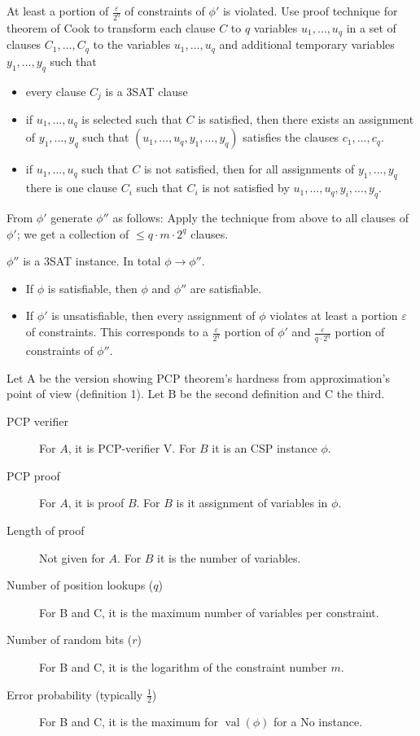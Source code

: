 \documentclass[a4paper]{article}
\begin{document}
At least a portion of $\frac{\varepsilon}{2^q}$ of constraints of $\phi'$
is violated. Use proof technique for theorem of Cook to transform each
clause $C$ to $q$ variables $u_1,\ldots,u_q$ in a set of clauses
$C_1,\ldots,C_q$ to the variables $u_1,\ldots,u_q$ and additional
temporary variables $y_1,\ldots,y_q$ such that
\begin{itemize}
  \item every clause $C_j$ is a 3SAT clause
  \item if $u_1,\ldots,u_q$ is selected such that $C$ is satisfied,
        then there exists an assignment of $y_1,\ldots,y_q$ such that
        $(u_1, \ldots, u_q, y_1, \ldots, y_q)$ satisfies the clauses
        $c_1,\ldots,c_q$.
  \item if $u_1,\ldots,u_q$ such that $C$ is not satisfied,
        then for all assignments of $y_1,\ldots,y_q$
        there is one clause $C_i$ such that $C_i$ is not satisfied
        by $u_1,\ldots,u_q,y_i,\ldots,y_q$.
\end{itemize}

From $\phi'$ generate $\phi''$ as follows:
Apply the technique from above to all clauses of $\phi'$;
we get a collection of $\leq q\cdot m\cdot 2^q$ clauses.

$\phi''$ is a 3SAT instance. In total $\phi \rightarrow \phi''$.
\begin{itemize}
  \item If $\phi$ is satisfiable, then $\phi$ and $\phi''$ are satisfiable.
  \item If $\phi'$ is unsatisfiable, then every assignment of $\phi$
        violates at least a portion $\varepsilon$ of constraints.
        This corresponds to a $\frac{\varepsilon}{2^q}$ portion of $\phi'$
        and $\frac{\varepsilon}{q\cdot2^q}$ portion of constraints
        of $\phi''$.
\end{itemize}

Let A be the version showing PCP theorem's hardness from
approximation's point of view (definition 1). Let B be the second definition
and C the third.

\begin{description}
  \item[PCP verifier]
    For $A$, it is PCP-verifier V. For $B$ it is an CSP instance $\phi$.
  \item[PCP proof]
    For $A$, it is proof $B$. For $B$ is it assignment of variables in $\phi$.
  \item[Length of proof]
    Not given for $A$. For $B$ it is the number of variables.
  \item[Number of position lookups ($q$)]
    For B and C, it is the maximum number of variables per constraint.
  \item[Number of random bits ($r$)]
    For B and C, it is the logarithm of the constraint number $m$.
  \item[Error probability (typically $\frac12$)]
    For B and C, it is the maximum for
    $\operatorname{val}(\phi)$ for a No instance.
\end{description}
\end{document}
